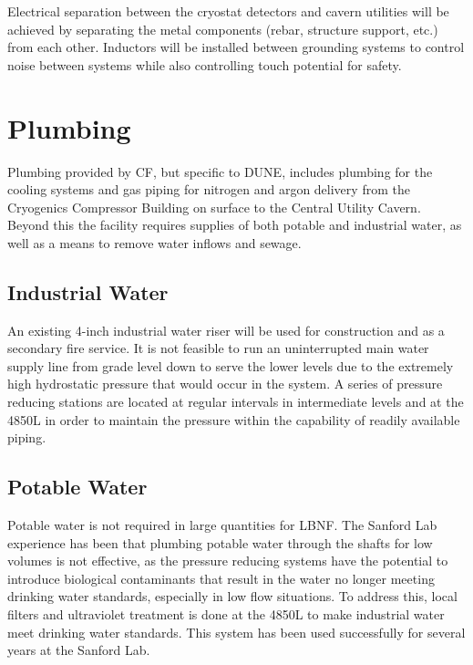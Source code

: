 Electrical separation between the cryostat detectors and cavern utilities will be achieved by separating the metal components (rebar, structure support, etc.) from each other.  Inductors will be installed between grounding systems to control noise between systems while also controlling touch potential for safety.

\section{Plumbing}
\label{sec:fscf-und-plumbing}

Plumbing provided by CF, but specific to DUNE, includes plumbing for the cooling systems and gas piping for nitrogen and argon delivery from the Cryogenics Compressor Building on surface to the Central Utility Cavern. Beyond this the facility requires supplies of both potable and industrial water, as well as a means to remove water inflows and sewage.  

\subsection{Industrial Water}
\label{sec:fscf-und-ind-h2o}

An existing 4-inch industrial water riser will be used for construction and as a secondary fire service. It is not feasible to run an uninterrupted main water supply line from grade level down to serve the lower levels due to the extremely high hydrostatic pressure that would occur in the system. A series of pressure reducing stations are located at regular intervals in intermediate levels and at the 4850L in order to maintain the pressure within the capability of readily available piping.

\subsection{Potable Water}
\label{sec:fscf-und-pot-h2o}

Potable water is not required in large quantities for LBNF.  The Sanford Lab experience has been that plumbing potable water through the shafts for low volumes is not effective, as the pressure reducing systems have the potential to introduce biological contaminants that result in the water no longer meeting drinking water standards, especially in low flow situations.  To address this, local filters and ultraviolet treatment is done at the 4850L to make industrial water meet drinking water standards.  This system has been used successfully for several years at the Sanford Lab.


